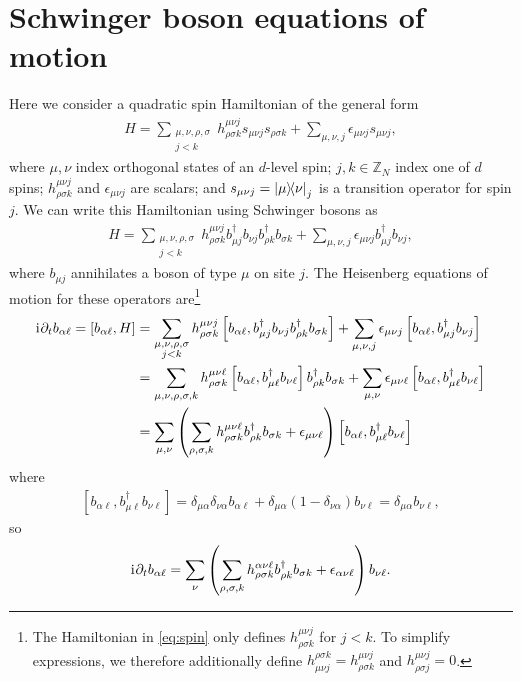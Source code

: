 \documentclass[nofootinbib,notitlepage,11pt]{revtex4-2}
\newcommand{\p}[1]{\left(#1\right)} %
\renewcommand{\sp}[1]{\left[#1\right]} %
\renewcommand{\d}{\partial} %
\renewcommand{\i}{\mathrm{i}\mkern1mu} %
\newcommand{\1}{\mathds{1}}
\newcommand{\ZZ}{\mathbb{Z}}
\begin{document}
\section{Schwinger boson equations of motion}
\label{sec:bosons}

Here we consider a quadratic spin Hamiltonian of the general form
\begin{align}
  H = \sum_{\substack{\mu,\nu,\rho,\sigma\\j<k}}
  h^{\mu\nu j}_{\rho\sigma k} s_{\mu\nu j} s_{\rho\sigma k}
  + \sum_{\mu,\nu,j} \epsilon_{\mu\nu j} s_{\mu\nu j},
  \label{eq:spin}
\end{align}
where $\mu,\nu$ index orthogonal states of an $d$-level spin; $j,k\in\ZZ_N$ index one of $d$ spins; $h^{\mu\nu j}_{\rho\sigma k}$ and $\epsilon_{\mu\nu j}$ are scalars; and $s_{\mu\nu j}=\op{\mu}{\nu}_j$ is a transition operator for spin $j$.  We can write this Hamiltonian using Schwinger bosons as
\begin{align}
  H = \sum_{\substack{\mu,\nu,\rho,\sigma\\j<k}}
  h^{\mu\nu j}_{\rho\sigma k}
  b_{\mu j}^\dag b_{\nu j} b_{\rho k}^\dag b_{\sigma k}
  + \sum_{\mu,\nu,j} \epsilon_{\mu\nu j} b_{\mu j}^\dag b_{\nu j},
\end{align}
where $b_{\mu j}$ annihilates a boson of type $\mu$ on site $j$.
The Heisenberg equations of motion for these operators are\footnote{The Hamiltonian in \eqref{eq:spin} only defines $h^{\mu\nu j}_{\rho\sigma k}$ for $j<k$.
  To simplify expressions, we therefore additionally define $h^{\rho\sigma k}_{\mu\nu j}=h^{\mu\nu j}_{\rho\sigma k}$ and $h^{\mu\nu j}_{\rho\sigma j}=0$.}
\begin{align}
  \i \d_t b_{\alpha\ell} = \sp{b_{\alpha\ell}, H}
  &= \sum_{\substack{\mu,\nu,\rho,\sigma\\j<k}}
  h^{\mu\nu j}_{\rho\sigma k}
  \sp{b_{\alpha\ell}, b_{\mu j}^\dag b_{\nu j} b_{\rho k}^\dag b_{\sigma k}}
  + \sum_{\mu,\nu,j} \epsilon_{\mu\nu j}
  \sp{b_{\alpha\ell}, b_{\mu j}^\dag b_{\nu j}} \\
  &= \sum_{\mu,\nu,\rho,\sigma,k} h^{\mu\nu\ell}_{\rho\sigma k}
  \sp{b_{\alpha\ell}, b_{\mu\ell}^\dag b_{\nu\ell}}
  b_{\rho k}^\dag b_{\sigma k}
  + \sum_{\mu,\nu} \epsilon_{\mu\nu\ell}
  \sp{b_{\alpha\ell}, b_{\mu\ell}^\dag b_{\nu\ell}} \\
  &= \sum_{\mu,\nu} \p{\sum_{\rho,\sigma,k}
    h^{\mu\nu\ell}_{\rho\sigma k} b_{\rho k}^\dag b_{\sigma k}
    + \epsilon_{\mu\nu\ell}}
  \sp{b_{\alpha\ell}, b_{\mu\ell}^\dag b_{\nu\ell}}
\end{align}
where
\begin{align}
  \sp{b_{\alpha\ell}, b_{\mu\ell}^\dag b_{\nu\ell}}
  = \delta_{\mu\alpha} \delta_{\nu\alpha} b_{\alpha\ell}
  + \delta_{\mu\alpha} \p{1-\delta_{\nu\alpha}} b_{\nu\ell}
  = \delta_{\mu\alpha} b_{\nu\ell},
\end{align}
so
\begin{align}
  \i \d_t b_{\alpha\ell}
  = \sum_\nu \p{\sum_{\rho,\sigma,k}
    h^{\alpha\nu\ell}_{\rho\sigma k} b_{\rho k}^\dag b_{\sigma k}
    + \epsilon_{\alpha\nu\ell}} b_{\nu\ell}.
\end{align}


\end{document}
